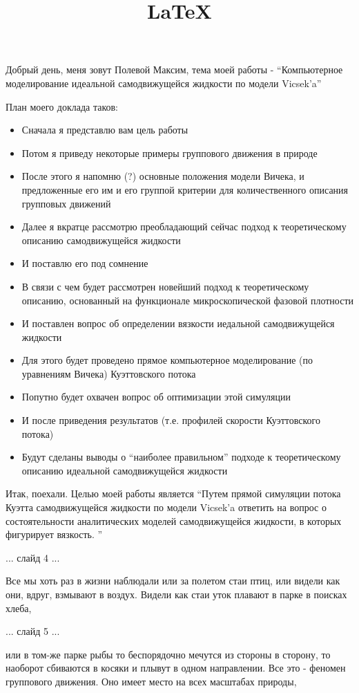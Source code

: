 \documentclass[a4paper,14pt,russian]{extreport}
\title{\LaTeX}
\date{}
\author{}
\begin{document}
  Добрый день, меня зовут Полевой Максим, тема моей работы - ``Компьютерное моделирование идеальной самодвижущейся жидкости по модели Vicsek'a''

  План моего доклада таков:
  \begin{itemize}
    \item Сначала я представлю вам цель работы
    \item Потом я приведу некоторые примеры группового движения в природе
    \item После этого я напомню (?) основные положения модели Вичека, и предложенные его им и его группой критерии для количественного описания групповых движений
    \item Далее я вкратце рассмотрю преобладающий сейчас подход к теоретическому описанию самодвижущейся жидкости
    \item И поставлю его под сомнение
    \item В связи с чем будет рассмотрен новейший подход к теоретическому описанию, основанный на функционале микроскопической фазовой плотности
    \item И поставлен вопрос об определении вязкости иедальной самодвижущейся жидкости
    \item Для этого будет проведено прямое компьютерное моделирование (по уравнениям Вичека) Куэттовского потока
    \item Попутно будет охвачен вопрос об оптимизации этой симуляции
    \item И после приведения результатов (т.е. профилей скорости Куэттовского потока)
    \item Будут сделаны выводы о ``наиболее правильном'' подходе к теоретическому описанию идеальной самодвижущейся жидкости
  \end{itemize}

  Итак, поехали. Целью моей работы является ``Путем прямой симуляции потока Куэтта самодвижущейся жидкости по модели Vicsek’a ответить на вопрос о состоятельности аналитических моделей самодвижущейся жидкости, в которых фигурирует вязкость.
''
  
  ... слайд 4 ...

  Все мы хоть раз в жизни наблюдали или за полетом стаи птиц, или видели как они, вдруг, взмывают в воздух. Видели как стаи уток плавают в парке в поисках хлеба, 

  ... слайд 5 ...

  или в том-же парке рыбы то беспорядочно мечутся из стороны в сторону, то наоборот сбиваются в косяки и плывут в одном направлении. Все это - феномен группового движения. Оно имеет место на всех масштабах природы, 
\end{document}
